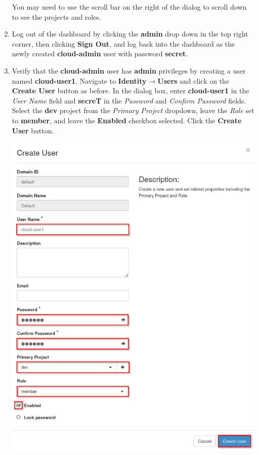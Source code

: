 \documentclass[letterpaper, 12pt]{article}
\begin{document}
\begin{enumerate}
    \begin{tipbox}{}
        You may need to use the scroll bar on the right of the dialog to scroll down to see the projects and roles.
    \end{tipbox}

    \item Log out of the dashboard by clicking the \textbf{admin} drop down in the top right corner, then clicking
    \textbf{Sign Out}, and log back into the dashboard as the newly created \textbf{cloud-admin} user with password
    \textbf{secret}.

    \item Verify that the \textbf{cloud-admin} user has \textbf{admin} privileges by creating a user named
    \textbf{cloud-user1}. Navigate to \textbf{Identity$\rightarrow$Users} and click on the \textbf{Create User} button
    as before. In the dialog box, enter \textbf{cloud-user1} in the \textit{User Name} field and \textbf{secreT} in the
    \textit{Password} and \textit{Confirm Password} fields. Select the \textbf{dev} project from the \textit{Primary
    Project} dropdown, leave the \textit{Role} set to \textbf{member}, and leave the \textbf{Enabled} checkbox
    selected. Click the \textbf{Create User} button.

    \begin{center}
        \includegraphics[width=\linewidth]{images/part5/step5.png}
    \end{center}


\end{enumerate}
\end{document}
